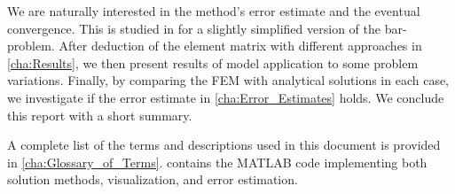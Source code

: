 We are naturally interested in the method's error estimate and the eventual convergence. This is studied in
 for a slightly simplified version of the bar-problem. After deduction of the element matrix with
different approaches in \cref{cha:Results}, we then present results of model application to some problem variations. Finally,
by comparing the FEM with analytical solutions in each case, we investigate if the error estimate in \cref{cha:Error_Estimates}
holds. We conclude this report with a short summary.

A complete list of the terms and descriptions used in this document is provided in \cref{cha:Glossary_of_Terms}.
 contains the MATLAB code implementing both solution methods, visualization, and error estimation.
%
